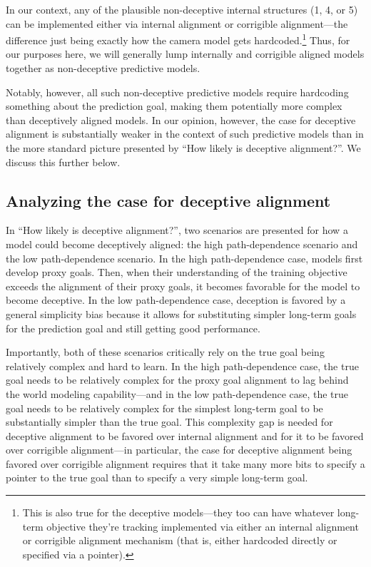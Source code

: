 \documentclass[
  onecolumn,
  nonatbib,
]{miri-tech-article}
\begin{document}
In our context, any of the plausible non-deceptive internal structures (1, 4, or 5) can be implemented either via internal alignment or corrigible alignment---the difference just being exactly how the camera model gets hardcoded.\footnote{This is also true for the deceptive models---they too can have whatever long-term objective they're tracking implemented via either an internal alignment or corrigible alignment mechanism (that is, either hardcoded directly or specified via a pointer).} Thus, for our purposes here, we will generally lump internally and corrigible aligned models together as non-deceptive predictive models.

Notably, however, all such non-deceptive predictive models require hardcoding something about the prediction goal, making them potentially more complex than deceptively aligned models. In our opinion, however, the case for deceptive alignment is substantially weaker in the context of such predictive models than in the more standard picture presented by ``How likely is deceptive alignment?\cite{how_likely_deception}''. We discuss this further below.


\subsection{Analyzing the case for deceptive alignment}

In ``How likely is deceptive alignment?\cite{how_likely_deception}'', two scenarios are presented for how a model could become deceptively aligned: the high path-dependence scenario and the low path-dependence scenario. In the high path-dependence case, models first develop proxy goals. Then, when their understanding of the training objective exceeds the alignment of their proxy goals, it becomes favorable for the model to become deceptive. In the low path-dependence case, deception is favored by a general simplicity bias because it allows for substituting simpler long-term goals for the prediction goal and still getting good performance.

Importantly, both of these scenarios critically rely on the true goal being relatively complex and hard to learn. In the high path-dependence case, the true goal needs to be relatively complex for the proxy goal alignment to lag behind the world modeling capability---and in the low path-dependence case, the true goal needs to be relatively complex for the simplest long-term goal to be substantially simpler than the true goal. This complexity gap is needed for deceptive alignment to be favored over internal alignment and for it to be favored over corrigible alignment---in particular, the case for deceptive alignment being favored over corrigible alignment requires that it take many more bits to specify a pointer to the true goal than to specify a very simple long-term goal.
\end{document}
